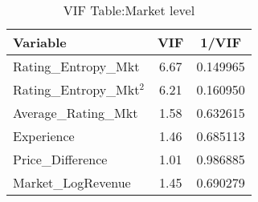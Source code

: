 \begin{table}[H]
\centering
\begin{tabular}{@{}lcc@{}}
\toprule
Variable           & VIF  & 1/VIF    \\ \midrule
Rating\_Entropy\_Mkt    & 6.67 & 0.149965 \\
Rating\_Entropy\_Mkt$^2$ & 6.21 & 0.160950 \\
Average\_Rating\_Mkt     & 1.58 & 0.632615 \\
Experience     & 1.46 & 0.685113 \\
Price\_Difference   & 1.01 & 0.986885 \\
Market\_LogRevenue     & 1.45 & 0.690279 \\ \bottomrule
\end{tabular}
\caption{VIF Table:Market level}
\label{vif_mkt}
\end{table} 